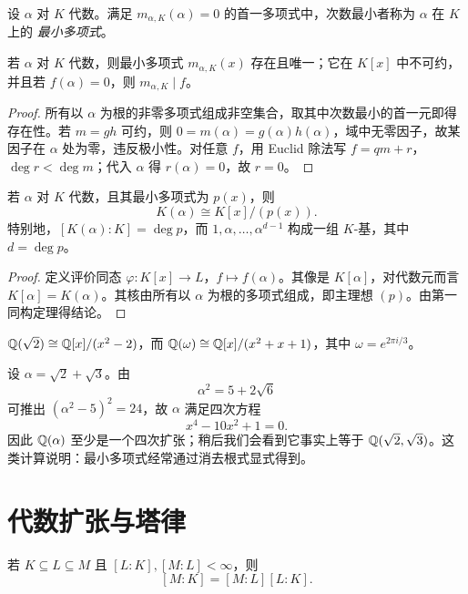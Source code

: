 \begin{definition}
设 $\alpha$ 对 $K$ 代数。满足 $m_{\alpha,K}(\alpha)=0$ 的首一多项式中，次数最小者称为 $\alpha$ 在 $K$ 上的 \emph{最小多项式}。
\end{definition}

\begin{theorem}
若 $\alpha$ 对 $K$ 代数，则最小多项式 $m_{\alpha,K}(x)$ 存在且唯一；它在 $K[x]$ 中不可约，并且若 $f(\alpha)=0$，则 $m_{\alpha,K}\mid f$。
\end{theorem}

\begin{proof}
所有以 $\alpha$ 为根的非零多项式组成非空集合，取其中次数最小的首一元即得存在性。若 $m=gh$ 可约，则 $0=m(\alpha)=g(\alpha)h(\alpha)$，域中无零因子，故某因子在 $\alpha$ 处为零，违反极小性。对任意 $f$，用 Euclid 除法写 $f=qm+r$，$\deg r<\deg m$；代入 $\alpha$ 得 $r(\alpha)=0$，故 $r=0$。
\end{proof}

\begin{theorem}
若 $\alpha$ 对 $K$ 代数，且其最小多项式为 $p(x)$，则
\[
 K(\alpha)\cong K[x]/(p(x)).
\]
特别地，$[K(\alpha):K]=\deg p$，而 $1,\alpha,\dots,\alpha^{d-1}$ 构成一组 $K$-基，其中 $d=\deg p$。
\end{theorem}

\begin{proof}
定义评价同态 $\varphi:K[x]\to L$，$f\mapsto f(\alpha)$。其像是 $K[\alpha]$，对代数元而言 $K[\alpha]=K(\alpha)$。其核由所有以 $\alpha$ 为根的多项式组成，即主理想 $(p)$。由第一同构定理得结论。
\end{proof}

\begin{example}
$\mathbb{Q}(\sqrt2)\cong \mathbb{Q}[x]/(x^2-2)$，而 $\mathbb{Q}(\omega)\cong \mathbb{Q}[x]/(x^2+x+1)$，其中 $\omega=e^{2\pi i/3}$。
\end{example}

\begin{example}
设 $\alpha=\sqrt2+\sqrt3$。由
\[
 \alpha^2=5+2\sqrt6
\]
可推出 $(\alpha^2-5)^2=24$，故 $\alpha$ 满足四次方程
\[
 x^4-10x^2+1=0.
\]
因此 $\mathbb{Q}(\alpha)$ 至少是一个四次扩张；稍后我们会看到它事实上等于 $\mathbb{Q}(\sqrt2,\sqrt3)$。这类计算说明：最小多项式经常通过消去根式显式得到。
\end{example}

\section{代数扩张与塔律}

\begin{proposition}[塔律]
若 $K\subseteq L\subseteq M$ 且 $[L:K],[M:L]<\infty$，则
\[
 [M:K]=[M:L][L:K].
\]
\end{proposition}

